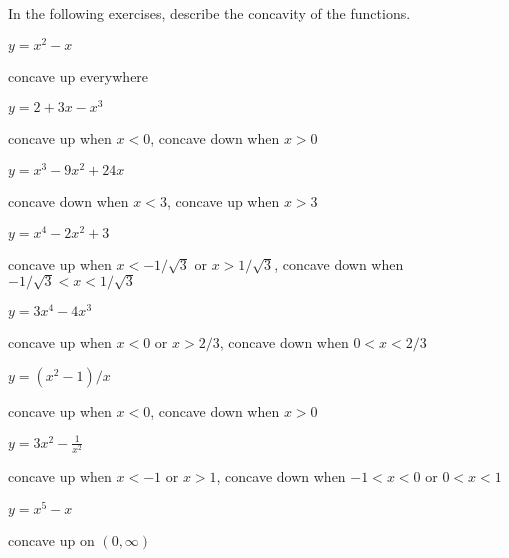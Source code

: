 \begin{exercises}
\noindent In the following exercises, describe the concavity of the functions.

\twocol

\begin{exercise} $y=x^2-x$ 
\begin{answer} concave up everywhere
\end{answer}\end{exercise}

\begin{exercise} $y=2+3x-x^3$ 
\begin{answer} concave up when $x<0$, concave down when $x>0$
\end{answer}\end{exercise}

\begin{exercise} $y=x^3-9x^2+24x$
\begin{answer} concave down when $x<3$, concave up when $x>3$
\end{answer}\end{exercise}

\begin{exercise} $y=x^4-2x^2+3$ 
\begin{answer} concave up when $x<-1/\sqrt3$ or $x>1/\sqrt3$,
concave down when $-1/\sqrt3<x<1/\sqrt3$
\end{answer}\end{exercise}

\begin{exercise} $y=3x^4-4x^3$
\begin{answer} concave up when $x<0$ or $x>2/3$,
concave down when $0<x<2/3$
\end{answer}\end{exercise}

\begin{exercise} $y=(x^2-1)/x$
\begin{answer} concave up when $x<0$, concave down when $x>0$
\end{answer}\end{exercise}

\begin{exercise} $y=3x^2-\frac{1}{x^2}$ 
\begin{answer} concave up when $x<-1$ or $x>1$, concave down when
$-1<x<0$ or $0<x<1$
\end{answer}\end{exercise}

\begin{exercise} $y= x^5 - x$
\begin{answer} concave up on $(0,\infty)$
\end{answer}\end{exercise}


\end{exercises}

